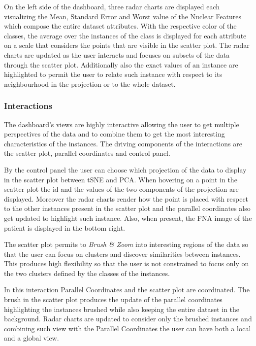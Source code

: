 \documentclass{article}
\begin{document}
On the left side of the dashboard, three radar charts are displayed each
visualizing the Mean, Standard Error and Worst value of the Nuclear Features
which compose the entire dataset attributes. With the respective color of the
classes, the average over the instances of the class is displayed for each
attribute on a scale that considers the points that are visible in the
scatter plot. The radar charts are updated as the user interacts and focuses on
subsets of the data through the scatter plot. Additionally also the exact values
of an instance are highlighted to permit the user to relate such instance with
respect to its neighbourhood in the projection or to the whole dataset.

\subsubsection*{Interactions}

The dashboard's views are highly interactive allowing the user to get multiple
perspectives of the data and to combine them to get the most interesting
characteristics of the instances. The driving components of the interactions
are the scatter plot, parallel coordinates and control panel.

By the control panel the user can choose which projection of the data to display
in the scatter plot between tSNE and PCA. When hovering on a point in the
scatter plot the id and the values of the two components of the projection are
displayed. Moreover the radar charts render how the point is placed with
respect to the other instances present in the scatter plot and the parallel
coordinates also get updated to highlight such instance. Also, when present, the
FNA image of the patient is displayed in the bottom right.

The scatter plot permits to \emph{Brush \& Zoom} into interesting regions of the data
so that the user can focus on clusters and discover similarities between
instances. This produces high flexibility so that the user is not constrained to
focus only on the two clusters defined by the classes of the instances.

In this interaction Parallel Coordinates and the scatter plot are coordinated.
The brush in the scatter plot produces the update of the parallel coordinates
highlighting the instances brushed while also keeping the entire dataset in the
background. Radar charts are updated to consider only the brushed instances and
combining such view with the Parallel Coordinates the user can have both a local
and a global view.
\end{document}
